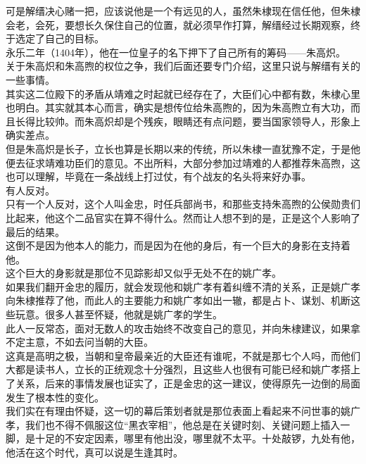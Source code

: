 \begin{multicols}{\theparacolNo}
可是解缙决心赌一把，应该说他是一个有远见的人，虽然朱棣现在信任他，但朱棣会老，会死，要想长久保住自己的位置，就必须早作打算，解缙经过长期观察，终于选定了自己的目标。\\

永乐二年（1404年），他在一位皇子的名下押下了自己所有的筹码——朱高炽。\\

关于朱高炽和朱高煦的权位之争，我们后面还要专门介绍，这里只说与解缙有关的一些事情。\\

其实这二位殿下的矛盾从靖难之时起就已经存在了，大臣们心中都有数，朱棣心里也明白。其实就其本心而言，确实是想传位给朱高煦的，因为朱高煦立有大功，而且长得比较帅。而朱高炽却是个残疾，眼睛还有点问题，要当国家领导人，形象上确实差点。\\

但是朱高炽是长子，立长也算是长期以来的传统，所以朱棣一直犹豫不定，于是他便去征求靖难功臣们的意见。不出所料，大部分参加过靖难的人都推荐朱高煦，这也可以理解，毕竟在一条战线上打过仗，有个战友的名头将来好办事。\\

有人反对。\\

只有一个人反对，这个人叫金忠，时任兵部尚书，和那些支持朱高煦的公侯勋贵们比起来，他这个二品官实在算不得什么。然而让人想不到的是，正是这个人影响了最后的结果。\\

这倒不是因为他本人的能力，而是因为在他的身后，有一个巨大的身影在支持着他。\\

这个巨大的身影就是那位不见踪影却又似乎无处不在的姚广孝。\\

如果我们翻开金忠的履历，就会发现他和姚广孝有着纠缠不清的关系，正是姚广孝向朱棣推荐了他，而此人的主要能力和姚广孝如出一辙，都是占卜、谋划、机断这些玩意。很多人甚至怀疑，他就是姚广孝的学生。\\

此人一反常态，面对无数人的攻击始终不改变自己的意见，并向朱棣建议，如果拿不定主意，不如去问当朝的大臣。\\

这真是高明之极，当朝和皇帝最亲近的大臣还有谁呢，不就是那七个人吗，而他们大都是读书人，立长的正统观念十分强烈，且这些人也很有可能已经和姚广孝搭上了关系，后来的事情发展也证实了，正是金忠的这一建议，使得原先一边倒的局面发生了根本性的变化。\\

我们实在有理由怀疑，这一切的幕后策划者就是那位表面上看起来不问世事的姚广孝，我们也不得不佩服这位“黑衣宰相”，他总是在关键时刻、关键问题上插入一脚，是十足的不安定因素，哪里有他出没，哪里就不太平。十处敲锣，九处有他，他活在这个时代，真可以说是生逢其时。\\


\end{multicols}
